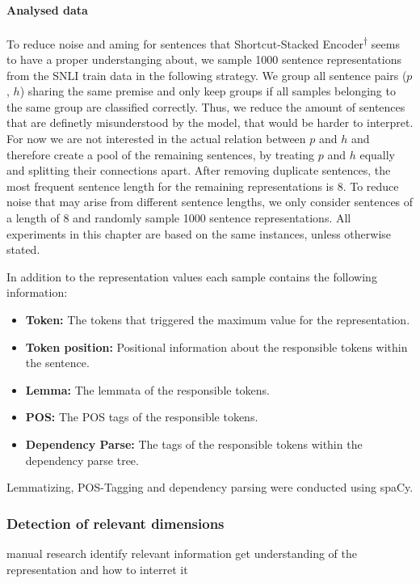 \paragraph*{Analysed data}
To reduce noise and aming for sentences that Shortcut-Stacked Encoder\textsuperscript{$\dagger$} seems to have a proper understanging about, we sample 1000 sentence representations from the \ac{SNLI} train data in the following strategy. We group all sentence pairs ($p$, $h$) sharing the same premise and only keep groups if all samples belonging to the same group are classified correctly. Thus, we reduce the amount of sentences that are definetly misunderstood by the model, that would be harder to interpret. For now we are not interested in the actual relation between $p$ and $h$ and therefore create a pool of the remaining sentences, by treating $p$ and $h$ equally and splitting their connections apart. After removing duplicate sentences, the most frequent sentence length for the remaining representations is 8. To reduce noise that may arise from different sentence lengths, we only consider sentences of a length of 8 and randomly sample 1000 sentence representations. All experiments in this chapter are based on the same instances, unless otherwise stated.
\newline

\noindent
In addition to the representation values each sample contains the following information:
\begin{itemize}
\item \textbf{Token:} The tokens that triggered the maximum value for the representation.
\item \textbf{Token position:} Positional information about the responsible tokens within the sentence.
\item \textbf{Lemma:} The lemmata of the responsible tokens.
\item \textbf{\ac{POS}:} The \ac{POS} tags of the responsible tokens.
\item \textbf{Dependency Parse:} The tags of the responsible tokens within the dependency parse tree.
\end{itemize}
Lemmatizing, \ac{POS}-Tagging and dependency parsing were conducted using spaCy.

\subsubsection{Detection of relevant dimensions}
manual research
identify relevant information
get understanding of the representation and how to interret it

